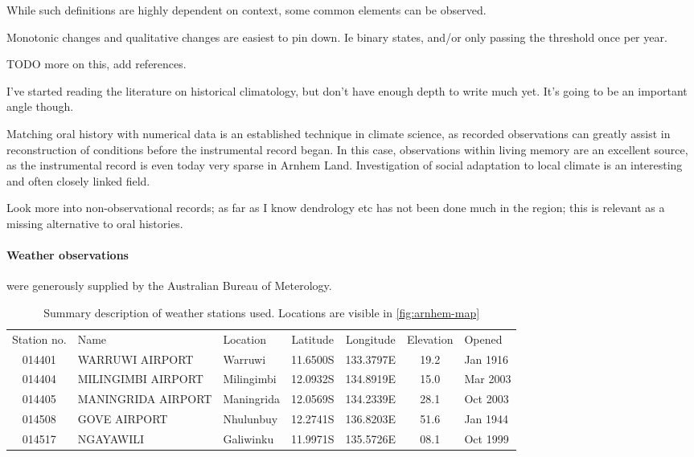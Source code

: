 While such definitions are highly dependent on context, some common
elements can be observed.

Monotonic changes and qualitative changes are easiest to pin down.
Ie binary states, and/or only passing the threshold once per year.

TODO more on this, add references.

I've started reading the literature on historical climatology, but don't have 
enough depth to write much yet.  It's going to be an important angle though. 

Matching oral history with numerical data is an established technique in 
climate science, as recorded observations can greatly assist in reconstruction 
of conditions before the instrumental record began.  In this case, observations 
within living memory are an excellent source, as the instrumental record is 
even today very sparse in Arnhem Land.  Investigation of social adaptation to 
local climate is an interesting and often closely linked field.

Look more into non-observational records; as far as I know dendrology etc has 
not been done much in the region; this is relevant as a missing alternative to 
oral histories.



\paragraph{Weather observations} were generously supplied by the
Australian Bureau of Meterology.

\begin{table}[h]
    \centering
    \begin{tabular}{cllcccl}
        Station no.  &  Name                &  Location     &  Latitude   &  Longitude   &  Elevation  &  Opened   \\
        014401       &  WARRUWI AIRPORT     &  Warruwi      &  11.6500S   &  133.3797E   &  19.2       &  Jan 1916 \\
        014404       &  MILINGIMBI AIRPORT  &  Milingimbi   &  12.0932S   &  134.8919E   &  15.0       &  Mar 2003 \\
        014405       &  MANINGRIDA AIRPORT  &  Maningrida   &  12.0569S   &  134.2339E   &  28.1       &  Oct 2003 \\
        014508       &  GOVE AIRPORT        &  Nhulunbuy    &  12.2741S   &  136.8203E   &  51.6       &  Jan 1944 \\
        014517       &  NGAYAWILI           &  Galiwinku    &  11.9971S   &  135.5726E   &  08.1       &  Oct 1999
    \end{tabular}
    \caption{Summary description of weather stations used.
        Locations are visible in \autoref{fig:arnhem-map}}
    \label{tab:weather-station-summary}
\end{table}

